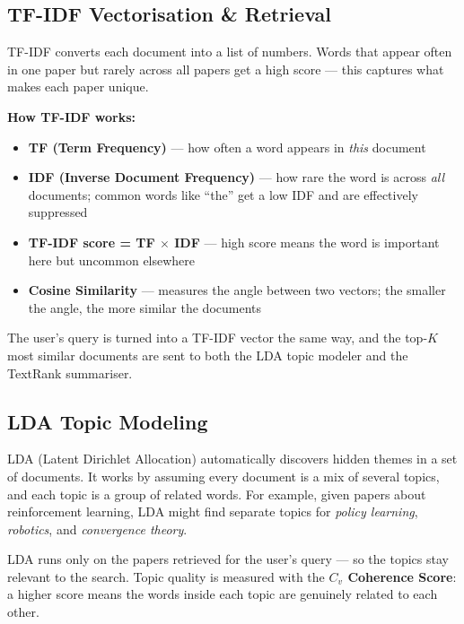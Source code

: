 \documentclass[11pt,a4paper]{article}
\begin{document}
\subsection{TF-IDF Vectorisation \& Retrieval}

TF-IDF converts each document into a list of numbers. Words that appear often in one paper but rarely across all papers get a high score --- this captures what makes each paper unique.

\begin{purplebox}
\textbf{How TF-IDF works:}
\begin{itemize}[leftmargin=1.4em,itemsep=1pt]
  \item \textbf{TF (Term Frequency)} --- how often a word appears in \emph{this} document
  \item \textbf{IDF (Inverse Document Frequency)} --- how rare the word is across \emph{all} documents; common words like ``the'' get a low IDF and are effectively suppressed
  \item \textbf{TF-IDF score = TF $\times$ IDF} --- high score means the word is important here but uncommon elsewhere
  \item \textbf{Cosine Similarity} --- measures the angle between two vectors; the smaller the angle, the more similar the documents
\end{itemize}
\end{purplebox}

The user's query is turned into a TF-IDF vector the same way, and the top-$K$ most similar documents are sent to both the LDA topic modeler and the TextRank summariser.

\subsection{LDA Topic Modeling}

LDA (Latent Dirichlet Allocation) automatically discovers hidden themes in a set of documents. It works by assuming every document is a mix of several topics, and each topic is a group of related words. For example, given papers about reinforcement learning, LDA might find separate topics for \textit{policy learning}, \textit{robotics}, and \textit{convergence theory}.

LDA runs only on the papers retrieved for the user's query --- so the topics stay relevant to the search. Topic quality is measured with the \textbf{$C_v$ Coherence Score}: a higher score means the words inside each topic are genuinely related to each other.
\end{document}

